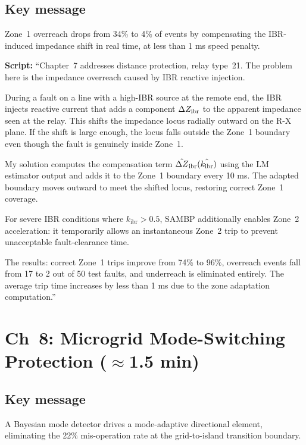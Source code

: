 \documentclass[11pt,a4paper]{article}
\newcommand{\script}[1]{\begin{scriptbox}\textbf{Script:} #1\end{scriptbox}}
\newcommand{\kibr}{k_{\mathrm{ibr}}}
\begin{document}
\subsection*{Key message}
Zone~1 overreach drops from 34\% to 4\% of events by compensating the IBR-induced
impedance shift in real time, at less than 1 ms speed penalty.

\script{%
``Chapter~7 addresses distance protection, relay type~21. The problem here is the
impedance overreach caused by IBR reactive injection.

During a fault on a line with a high-IBR source at the remote end, the IBR injects
reactive current that adds a component $\Delta Z_{\rm ibr}$ to the apparent impedance
seen at the relay. This shifts the impedance locus radially outward on the R-X plane.
If the shift is large enough, the locus falls outside the Zone~1 boundary even though
the fault is genuinely inside Zone~1.

My solution computes the compensation term $\hat{\Delta Z}_{\rm ibr}(\hat{\kibr})$ using
the LM estimator output and adds it to the Zone~1 boundary every 10 ms. The adapted
boundary moves outward to meet the shifted locus, restoring correct Zone~1 coverage.

For severe IBR conditions where $\kibr > 0.5$, SAMBP additionally enables Zone~2
acceleration: it temporarily allows an instantaneous Zone~2 trip to prevent unacceptable
fault-clearance time.

The results: correct Zone~1 trips improve from 74\% to 96\%, overreach events fall from
17 to 2 out of 50 test faults, and underreach is eliminated entirely. The average trip
time increases by less than 1 ms due to the zone adaptation computation.''%
}

\section{Ch~8: Microgrid Mode-Switching Protection \hfill\normalfont\small($\approx$1.5 min)}
\label{slide:mg}

\subsection*{Key message}
A Bayesian mode detector drives a mode-adaptive directional element, eliminating
the 22\% mis-operation rate at the grid-to-island transition boundary.
\end{document}
